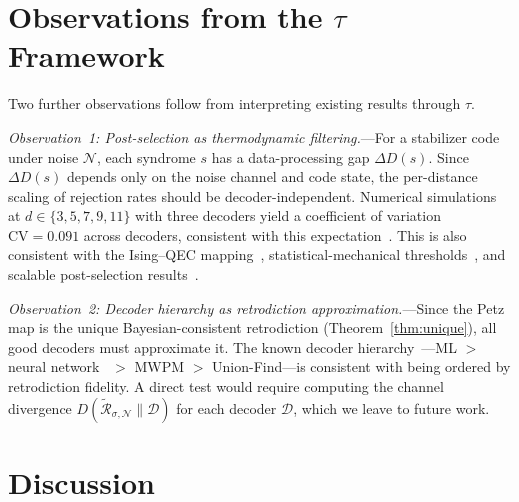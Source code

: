 \documentclass[prl,twocolumn,superscriptaddress,longbibliography,floatfix]{revtex4-2}
\newcommand{\Petz}{\mathcal{R}}
\newcommand{\chan}{\mathcal{N}}
\newcommand{\tauasym}{\tau}
\begin{document}
\section{Observations from the \texorpdfstring{$\tauasym$}{tau} Framework}
\label{sec:observations}

Two further observations follow from interpreting existing results
through $\tauasym$.

\emph{Observation~1: Post-selection as thermodynamic
filtering.}---For a stabilizer code under noise $\chan$, each
syndrome $s$ has a data-processing gap $\Delta D(s)$.
Since $\Delta D(s)$ depends only on the noise channel and code
state, the per-distance scaling of rejection rates should be
decoder-independent.  Numerical simulations at
$d \in \{3,5,7,9,11\}$ with three decoders yield a coefficient
of variation $\text{CV} = 0.091$ across decoders, consistent with
this expectation~\cite{SM}.
This is also consistent with the Ising--QEC
mapping~\cite{EnglishEtAl2025}, statistical-mechanical
thresholds~\cite{EnglishWilliamsonBartlett2025}, and scalable
post-selection results~\cite{ChenEtAl2025,SmithBrownBartlett2024}.

\emph{Observation~2: Decoder hierarchy as retrodiction
approximation.}---Since the Petz map is the unique
Bayesian-consistent retrodiction (Theorem~\ref{thm:unique}), all
good decoders must approximate it.  The known decoder
hierarchy~\cite{deMartiOlius2024}---ML $>$ neural
network~\cite{Bausch2024,Acharya2025} $>$ MWPM $>$ Union-Find---is consistent
with being ordered by retrodiction fidelity.  A direct test would
require computing the channel divergence
$D(\tilde{\Petz}_{\sigma,\chan}\|\mathcal{D})$ for each decoder
$\mathcal{D}$, which we leave to future work.

\section{Discussion}
\label{sec:discussion}
\end{document}
